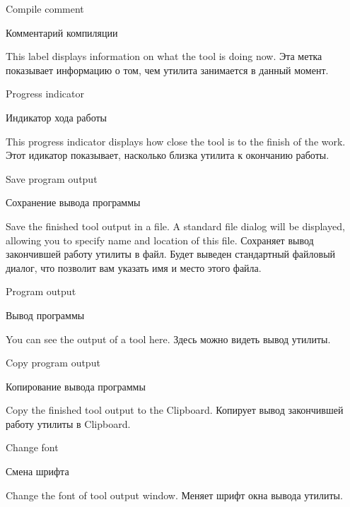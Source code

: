 \begin{popup}
\ifenglish
\caption{Compile comment}
\else
\caption{Комментарий компиляции}
\fi
{}
\ifenglish
This label displays information on what the tool is doing now.
\else
Эта метка показывает информацию о том, чем утилита занимается в данный момент.
\fi
\end{popup}

\begin{popup}
\ifenglish
\caption{Progress indicator}
\else
\caption{Индикатор хода работы}
\fi
{}
\ifenglish
This progress indicator displays how close the tool is to the finish of the work.
\else
Этот идикатор показывает, насколько близка утилита к окончанию работы.
\fi
\end{popup}

\begin{popup}
\ifenglish
\caption{Save program output}
\else
\caption{Сохранение вывода программы}
\fi
{}

\ifenglish
Save the finished tool output
in a file. A standard file dialog will be displayed, allowing you to
specify name and location of this file.
\else
Сохраняет вывод закончившей работу утилиты в файл. Будет выведен стандартный
файловый диалог, что позволит вам указать имя и место этого файла.
\fi

\end{popup}

\begin{popup}
\ifenglish
\caption{Program output}
\else
\caption{Вывод программы}
\fi
{}

\ifenglish
You can see the output of a tool here.
\else
Здесь можно видеть вывод утилиты.
\fi
\end{popup}

\begin{popup}
\ifenglish
\caption{Copy program output}
\else
\caption{Копирование вывода программы}
\fi
{}

\ifenglish
Copy the finished tool output to the Clipboard.
\else
Копирует вывод закончившей работу утилиты в Clipboard.
\fi
\end{popup}

\begin{popup}
\ifenglish
\caption{Change font}
\else
\caption{Смена шрифта}
\fi
{}

\ifenglish
Change the font of tool output window.
\else
Меняет шрифт окна вывода утилиты.
\fi
\end{popup}

